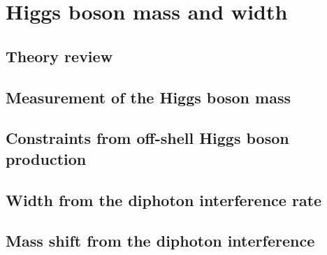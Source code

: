 \documentclass[../report.tex]{subfiles}
\providecommand{\main}{..}
\begin{document}
\section{Higgs boson mass and width}\label{sec5}

\subsection{Theory review}



\subsection{Measurement of the Higgs boson mass}

\label{sec:5_HiggsMass}



\subsection{Constraints from off-shell Higgs boson production}

\label{sec:5_offshell}

\subsection{Width from the diphoton interference rate} 
\label{sec:5_interference_real}


\subsection{Mass shift from the diphoton interference}
\label{sec:5_interference_imag}



%

%
%
\end{document}
